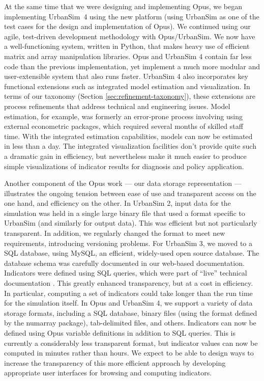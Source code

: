 At the same time that we were designing and implementing Opus, we began
implementing UrbanSim~4 using the new platform (using UrbanSim as
one of the test cases for the design and implementation of Opus). We
continued using our agile, test-driven development methodology with
Opus/UrbanSim. We now have a well-functioning system, written in
Python, that makes heavy use of efficient matrix and array
manipulation libraries.  Opus and UrbanSim 4
contain far less code than the previous implementation, yet
implement a much more modular and user-extensible system that also
runs faster. UrbanSim 4 also incorporates key functional extensions
such as integrated model estimation and visualization.  In terms of
our taxonomy (Section \ref{sec:refinement-taxonomy}), these
extensions are process refinements that address technical and
engineering issues. Model estimation, for example, was formerly an
error-prone process involving using external econometric packages,
which required several months of skilled staff time.  With the
integrated estimation capabilities, models can now be estimated in
less than a day.  The integrated visualization facilities don't
provide quite such a dramatic gain in efficiency, but nevertheless
make it much easier to produce simple visualizations of indicator
results for diagnosis and policy application.


Another component of the Opus work --- our data storage
representation --- illustrates the ongoing tension between ease of
use and transparent access on the one hand, and efficiency on the
other.  In UrbanSim 2, input data for the simulation was held in a
single large binary file that used a format specific to UrbanSim
(and similarly for output data).  This was efficient but not
particularly transparent.  In addition, we regularly changed the
format to meet new requirements, introducing versioning problems.
For UrbanSim 3, we moved to a SQL database, using MySQL, an
efficient, widely-used open source database.  The database schema
was carefully documented in our web-based documentation.  Indicators
were defined using SQL queries, which were part of ``live''
technical documentation \cite{borning-ecscw-2005}.  This greatly
enhanced transparency, but at a cost in efficiency.  In particular,
computing a set of indicators could take longer than the run time
for the simulation itself.  In Opus and UrbanSim 4, we support a variety of
data storage formats, including a SQL database, binary files (using
the format defined by the numarray package), tab-delimited files,
and others. Indicators can now be defined using Opus variable
definitions in addition to SQL queries. This is currently a
considerably less transparent format, but indicator values can now
be computed in minutes rather than hours.  We expect to be able to
design ways to increase the transparency of this more efficient
approach by developing appropriate user interfaces for browsing and
computing indicators.

